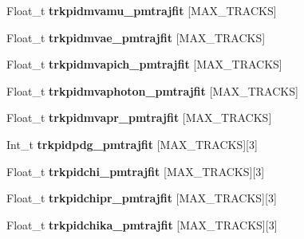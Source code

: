 \begin{DoxyCompactItemize}
\item 
\hypertarget{classanatree_abdc0b461dd4ae741e79dc44b43613f8b}{Float\-\_\-t {\bfseries trkpidmvamu\-\_\-pmtrajfit} \mbox{[}M\-A\-X\-\_\-\-T\-R\-A\-C\-K\-S\mbox{]}}\label{classanatree_abdc0b461dd4ae741e79dc44b43613f8b}

\item 
\hypertarget{classanatree_aa63656e8d9ace690034a03fb6bb67c8a}{Float\-\_\-t {\bfseries trkpidmvae\-\_\-pmtrajfit} \mbox{[}M\-A\-X\-\_\-\-T\-R\-A\-C\-K\-S\mbox{]}}\label{classanatree_aa63656e8d9ace690034a03fb6bb67c8a}

\item 
\hypertarget{classanatree_a312cdb3d468947bcf063fb4a03b127d5}{Float\-\_\-t {\bfseries trkpidmvapich\-\_\-pmtrajfit} \mbox{[}M\-A\-X\-\_\-\-T\-R\-A\-C\-K\-S\mbox{]}}\label{classanatree_a312cdb3d468947bcf063fb4a03b127d5}

\item 
\hypertarget{classanatree_ac5425c12babfab45fa71d1ea8b65d0d8}{Float\-\_\-t {\bfseries trkpidmvaphoton\-\_\-pmtrajfit} \mbox{[}M\-A\-X\-\_\-\-T\-R\-A\-C\-K\-S\mbox{]}}\label{classanatree_ac5425c12babfab45fa71d1ea8b65d0d8}

\item 
\hypertarget{classanatree_a2a02ebfb204d49befb28b466a2720f9e}{Float\-\_\-t {\bfseries trkpidmvapr\-\_\-pmtrajfit} \mbox{[}M\-A\-X\-\_\-\-T\-R\-A\-C\-K\-S\mbox{]}}\label{classanatree_a2a02ebfb204d49befb28b466a2720f9e}

\item 
\hypertarget{classanatree_a6b025f1c33d29e35c07d799a350af0b0}{Int\-\_\-t {\bfseries trkpidpdg\-\_\-pmtrajfit} \mbox{[}M\-A\-X\-\_\-\-T\-R\-A\-C\-K\-S\mbox{]}\mbox{[}3\mbox{]}}\label{classanatree_a6b025f1c33d29e35c07d799a350af0b0}

\item 
\hypertarget{classanatree_a998285285751cf5584e4831fd07fe150}{Float\-\_\-t {\bfseries trkpidchi\-\_\-pmtrajfit} \mbox{[}M\-A\-X\-\_\-\-T\-R\-A\-C\-K\-S\mbox{]}\mbox{[}3\mbox{]}}\label{classanatree_a998285285751cf5584e4831fd07fe150}

\item 
\hypertarget{classanatree_a7bbaa141c9a2a46a901631a1bcc877b8}{Float\-\_\-t {\bfseries trkpidchipr\-\_\-pmtrajfit} \mbox{[}M\-A\-X\-\_\-\-T\-R\-A\-C\-K\-S\mbox{]}\mbox{[}3\mbox{]}}\label{classanatree_a7bbaa141c9a2a46a901631a1bcc877b8}

\item 
\hypertarget{classanatree_a6a05fa8f75ccecb35ac811b5348bf5ee}{Float\-\_\-t {\bfseries trkpidchika\-\_\-pmtrajfit} \mbox{[}M\-A\-X\-\_\-\-T\-R\-A\-C\-K\-S\mbox{]}\mbox{[}3\mbox{]}}\label{classanatree_a6a05fa8f75ccecb35ac811b5348bf5ee}


\end{DoxyCompactItemize}
